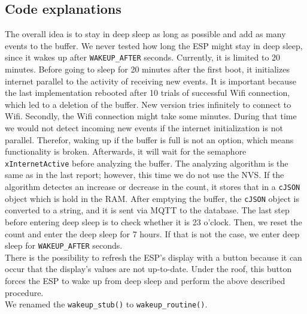 \subsection{Code explanations}
The overall idea is to stay in deep sleep as long as possible and add as many events to the buffer.
We never tested how long the ESP might stay in deep sleep,
since it wakes up after \verb!WAKEUP_AFTER! seconds. Currently, it is limited to 20 minutes.
Before going to sleep for 20 minutes after the first boot, it initializes internet parallel to the 
activity of receiving new events. It is important because the last implementation
rebooted after 10 trials of successful Wifi connection, which led to a deletion of the buffer.
New version tries infinitely to connect to Wifi.
Secondly, the Wifi connection might take some minutes. During that time we would not detect
incoming new events if the internet initialization is not parallel. Therefor, waking up if the buffer is full
is not an option, which means functionality is broken.
Afterwards, it will wait for the semaphore \verb!xInternetActive!
before analyzing the buffer. The analyzing algorithm is the same as in the last report; however,
this time we do not use the NVS. If the algorithm detectes an increase or decrease in the count,
it stores that in a \verb!cJSON! object which is hold in the RAM.
After emptying the buffer, the \verb!cJSON! object is converted to a string, and it is sent via MQTT to
the database. The last step before entering deep sleep is to check whether it is 23 o'clock.
Then, we reset the count and enter the deep sleep for 7 hours. If that is not the case,
we enter deep sleep for \verb!WAKEUP_AFTER! seconds.\\
There is the possibility to refresh the ESP's display with a button because it can occur that the display's values
are not up-to-date. Under the roof, this button forces the ESP to wake up from deep sleep and
perform the above described procedure. \\
We renamed the \verb!wakeup_stub()! to \verb!wakeup_routine()!.





